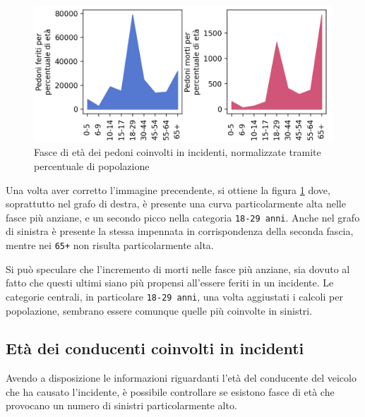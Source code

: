 \documentclass[a4paper,12pt]{report}
\newcommand{\columnstyle}[1]{\texttt{#1}}
\begin{document}
\begin{figure}
    \includegraphics[width=\linewidth]{../src/incidenti/incidenti_senza_coords/pedoni/eta_pedoni_norm.png}
    \caption{Fasce di età dei pedoni coinvolti in incidenti, normalizzate tramite percentuale di popolazione}
    \label{fig:eta-pedoni-norm}
\end{figure}

Una volta aver corretto l'immagine precendente, si ottiene la figura \ref{fig:eta-pedoni-norm} 
dove, soprattutto nel grafo di destra, è presente una curva particolarmente alta 
nelle fasce più anziane, e un secondo picco nella categoria \columnstyle{18-29 anni}.
Anche nel grafo di sinistra è presente la stessa impennata in corrispondenza 
della seconda fascia, mentre nei \columnstyle{65+} non 
risulta particolarmente alta.

Si può speculare che l'incremento di morti nelle fasce più anziane, sia dovuto al 
fatto che questi ultimi siano più propensi all'essere feriti in un incidente. 
Le categorie centrali, in particolare \columnstyle{18-29 anni}, una volta 
aggiustati i calcoli per popolazione, sembrano essere comunque quelle più 
coinvolte in sinistri.

\subsection{Età dei conducenti coinvolti in incidenti}

Avendo a disposizione le informazioni riguardanti l'età del conducente del 
veicolo che ha causato l'incidente, è possibile controllare se esistono fasce di 
età che provocano un numero di sinistri particolarmente alto.
\end{document}
